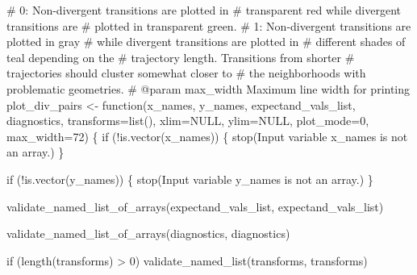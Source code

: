 \documentclass[
  letterpaper,
  DIV=11,
  numbers=noendperiod]{scrartcl}
\newenvironment{Shaded}{\begin{snugshade}}{\end{snugshade}}
\newcommand{\BuiltInTok}[1]{\textcolor[rgb]{0.00,0.23,0.31}{#1}}
\newcommand{\CommentTok}[1]{\textcolor[rgb]{0.37,0.37,0.37}{#1}}
\newcommand{\ControlFlowTok}[1]{\textcolor[rgb]{0.00,0.23,0.31}{#1}}
\newcommand{\DecValTok}[1]{\textcolor[rgb]{0.68,0.00,0.00}{#1}}
\newcommand{\KeywordTok}[1]{\textcolor[rgb]{0.00,0.23,0.31}{#1}}
\newcommand{\NormalTok}[1]{\textcolor[rgb]{0.00,0.23,0.31}{#1}}
\newcommand{\OperatorTok}[1]{\textcolor[rgb]{0.37,0.37,0.37}{#1}}
\newcommand{\StringTok}[1]{\textcolor[rgb]{0.13,0.47,0.30}{#1}}
\begin{document}
\begin{Shaded}
\begin{Highlighting}[]
\CommentTok{\#                     0: Non{-}divergent transitions are plotted in }
\CommentTok{\#                        transparent red while divergent transitions are}
\CommentTok{\#                        plotted in transparent green.}
\CommentTok{\#                     1: Non{-}divergent transitions are plotted in gray }
\CommentTok{\#                        while divergent transitions are plotted in }
\CommentTok{\#                        different shades of teal depending on the }
\CommentTok{\#                        trajectory length.  Transitions from shorter}
\CommentTok{\#                        trajectories should cluster somewhat closer to }
\CommentTok{\#                        the neighborhoods with problematic geometries.}
\CommentTok{\# @param max\_width Maximum line width for printing}
\NormalTok{plot\_div\_pairs }\OperatorTok{\textless{}{-}}\NormalTok{ function(x\_names, y\_names, }
\NormalTok{                           expectand\_vals\_list, diagnostics,}
\NormalTok{                           transforms}\OperatorTok{=}\BuiltInTok{list}\NormalTok{(), xlim}\OperatorTok{=}\NormalTok{NULL, ylim}\OperatorTok{=}\NormalTok{NULL,}
\NormalTok{                           plot\_mode}\OperatorTok{=}\DecValTok{0}\NormalTok{, max\_width}\OperatorTok{=}\DecValTok{72}\NormalTok{) \{}
  \ControlFlowTok{if}\NormalTok{ (}\OperatorTok{!}\KeywordTok{is}\NormalTok{.vector(x\_names)) \{}
\NormalTok{    stop(}\StringTok{\textquotesingle{}Input variable \textasciigrave{}x\_names\textasciigrave{} is not an array.\textquotesingle{}}\NormalTok{)}
\NormalTok{  \}}
  
  \ControlFlowTok{if}\NormalTok{ (}\OperatorTok{!}\KeywordTok{is}\NormalTok{.vector(y\_names)) \{}
\NormalTok{    stop(}\StringTok{\textquotesingle{}Input variable \textasciigrave{}y\_names\textasciigrave{} is not an array.\textquotesingle{}}\NormalTok{)}
\NormalTok{  \}}
  
\NormalTok{  validate\_named\_list\_of\_arrays(expectand\_vals\_list,}
                                \StringTok{\textquotesingle{}expectand\_vals\_list\textquotesingle{}}\NormalTok{)}

\NormalTok{  validate\_named\_list\_of\_arrays(diagnostics, }\StringTok{\textquotesingle{}diagnostics\textquotesingle{}}\NormalTok{)}

  \ControlFlowTok{if}\NormalTok{ (length(transforms) }\OperatorTok{\textgreater{}} \DecValTok{0}\NormalTok{)}
\NormalTok{    validate\_named\_list(transforms, }\StringTok{\textquotesingle{}transforms\textquotesingle{}}\NormalTok{)}
  

\end{Highlighting}
\end{Shaded}
\end{document}
